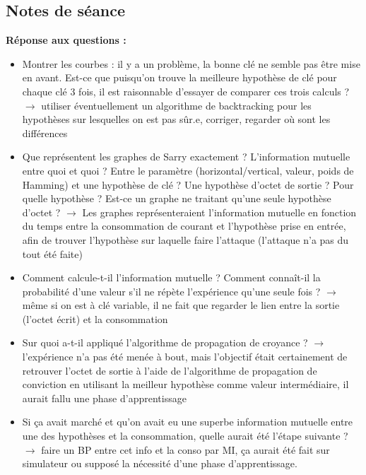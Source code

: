 \documentclass[12pt]{article}
\begin{document}
	\subsection{Notes de séance}
	\textbf{Réponse aux questions :}
		\begin{itemize}
		\item Montrer les courbes : il y a un problème, la bonne clé ne semble pas être mise en avant. Est-ce que puisqu'on trouve la meilleure hypothèse de clé pour chaque clé 3 fois, il est raisonnable d'essayer de comparer ces trois calculs ? $\rightarrow$ utiliser éventuellement un algorithme de backtracking pour les hypothèses sur lesquelles on est pas sûr.e, corriger, regarder où sont les différences
		\item Que représentent les graphes de Sarry exactement ? L'information mutuelle entre quoi et quoi ? Entre le paramètre (horizontal/vertical, valeur, poids de Hamming) et une hypothèse de clé ? Une hypothèse d'octet de sortie ? Pour quelle hypothèse ? Est-ce un graphe ne traitant qu'une seule hypothèse d'octet ? $\rightarrow$ Les graphes représenteraient l'information mutuelle en fonction du temps entre la consommation de courant et l'hypothèse prise en entrée, afin de trouver l'hypothèse sur laquelle faire l'attaque (l'attaque n'a pas du tout été faite)
		\item Comment calcule-t-il l'information mutuelle ? Comment connaît-il la probabilité d'une valeur s'il ne répète l'expérience qu'une seule fois ? $\rightarrow$ même si on est à clé variable, il ne fait que regarder le lien entre la sortie (l'octet écrit) et la consommation
		\item Sur quoi a-t-il appliqué l'algorithme de propagation de croyance ? $\rightarrow$ l'expérience n'a pas été menée à bout, mais l'objectif était certainement de retrouver l'octet de sortie à l'aide de l'algorithme de propagation de conviction en utilisant la meilleur hypothèse comme valeur intermédiaire, il aurait fallu une phase d'apprentissage
		\item Si ça avait marché et qu'on avait eu une superbe information mutuelle entre une des hypothèses et la consommation, quelle aurait été l'étape suivante ? $\rightarrow$ faire un BP entre cet info et la conso par MI, ça aurait été fait sur simulateur ou supposé la nécessité d'une phase d'apprentissage.
	\end{itemize}
	
\end{document}
